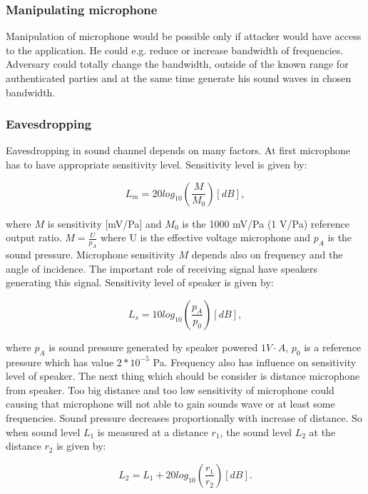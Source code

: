 \documentclass[11pt,titlepage]{article}
\theoremstyle{plain}
\begin{document}
\subsubsection{Manipulating microphone}
Manipulation of microphone would be possible only if attacker would have access to the application. He could e.g. reduce or increase bandwidth of frequencies. Adversary could totally change the bandwidth, outside of the known range for authenticated parties and at the same time generate his sound waves in chosen bandwidth.

\subsubsection{Eavesdropping}
Eavesdropping in sound channel depends on many factors.
 At first microphone has to have appropriate sensitivity level. Sensitivity level is given by:
 
 \begin{equation}
 L_m = 20 log_{10}\left(\frac{M}{M_0}\right)[dB],
 \end{equation}
 
 where $M$ is sensitivity [mV/Pa] and $M_0$ is the 1000 mV/Pa (1 V/Pa) reference output ratio. $M = \frac{U}{p_A}$ where U is the effective voltage microphone and $p_A$ is the sound pressure. Microphone sensitivity $M$ depends also on frequency and the angle of incidence. The important role of receiving signal have speakers generating this signal. Sensitivity level of speaker is given by: 
 
 \begin{equation}
 L_s = 10 log_{10}\left(\frac{p_A}{p_0}\right)[dB],
 \end{equation}
 
 where $p_A$ is sound pressure generated by speaker powered $1V \cdot A$, $p_0$ is a reference pressure which has value $2*10^{-5}$ Pa. Frequency also has influence on sensitivity level of speaker. The next thing which should be consider is distance microphone from speaker. Too big distance and too low sensitivity of microphone could causing that microphone will not able to gain sounds wave or at least some frequencies. Sound pressure decreases proportionally with increase of distance. So when sound level $L_{1}$ is measured at a distance $r_1$, the sound level $L_2$ at the distance $r_2$ is given by:
 
 \begin{equation}
 L_2 = L_1 + 20 log_{10} \left(\frac{r_1}{r_2}\right)[dB].
 \end{equation}
\end{document}

